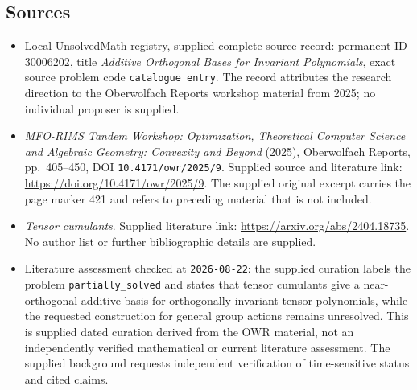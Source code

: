 \documentclass[11pt]{article}
\begin{document}
\subsection{Sources}
\begin{itemize}
\item Local UnsolvedMath registry, supplied complete source record: permanent ID \(30006202\), title \emph{Additive Orthogonal Bases for Invariant Polynomials}, exact source problem code \texttt{catalogue entry}. The record attributes the research direction to the Oberwolfach Reports workshop material from 2025; no individual proposer is supplied.
\item \emph{MFO-RIMS Tandem Workshop: Optimization, Theoretical Computer Science and Algebraic Geometry: Convexity and Beyond} (2025), Oberwolfach Reports, pp.\ 405--450, DOI \texttt{10.4171/owr/2025/9}. Supplied source and literature link: \url{https://doi.org/10.4171/owr/2025/9}. The supplied original excerpt carries the page marker 421 and refers to preceding material that is not included.
\item \emph{Tensor cumulants}. Supplied literature link: \url{https://arxiv.org/abs/2404.18735}. No author list or further bibliographic details are supplied.
\item Literature assessment checked at \texttt{2026-08-22}: the supplied curation labels the problem \texttt{partially\_solved} and states that tensor cumulants give a near-orthogonal additive basis for orthogonally invariant tensor polynomials, while the requested construction for general group actions remains unresolved. This is supplied dated curation derived from the OWR material, not an independently verified mathematical or current literature assessment. The supplied background requests independent verification of time-sensitive status and cited claims.
\end{itemize}
\end{document}
